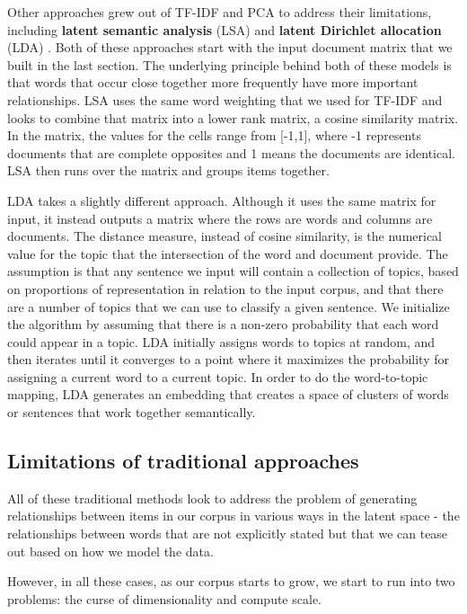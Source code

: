 \documentclass[11pt, table]{diazessay} %
\begin{document}
\begin{sloppypar}
Other approaches grew out of TF-IDF and PCA to address their limitations, including \textbf{latent semantic analysis} (LSA) and \textbf{latent Dirichlet allocation} (LDA) \cite{cvitanic2016lda}.  Both of these approaches start with the input document matrix that we built in the last section. The underlying principle behind both of these models is that words that occur close together more frequently have more important relationships. LSA uses the same word weighting that we used for TF-IDF and looks to combine that matrix into a lower rank matrix, a cosine similarity matrix. In the matrix, the values for the cells range from [-1,1], where -1 represents documents that are complete opposites and 1 means the documents are identical. LSA then runs over the matrix and groups items together.  

LDA takes a slightly different approach. Although it uses the same matrix for input, it instead outputs a matrix where the rows are words and columns are documents. The distance measure, instead of cosine similarity, is the numerical value for the topic that the intersection of the word and document provide.  The assumption is that any sentence we input will contain a collection of topics, based on proportions of representation in relation to the input corpus, and that there are a number of topics that we can use to classify a given sentence. We initialize the algorithm by assuming that there is a non-zero probability that each word could appear in a topic. LDA initially assigns words to topics at random, and then iterates until it converges to a point where it maximizes the probability for assigning a current word to a current topic.  In order to do the word-to-topic mapping, LDA generates an embedding that creates a space of clusters of words or sentences that work together semantically.

\subsection{Limitations of traditional approaches}
 
 All of these traditional methods look to address the problem of generating relationships between items in our corpus in various ways in the latent space - the relationships between words that are not explicitly stated but that we can tease out based on how we model the data.
 
 However, in all these cases, as our corpus starts to grow, we start to run into two problems: the curse of dimensionality and compute scale.
 

\end{sloppypar}
\end{document}
